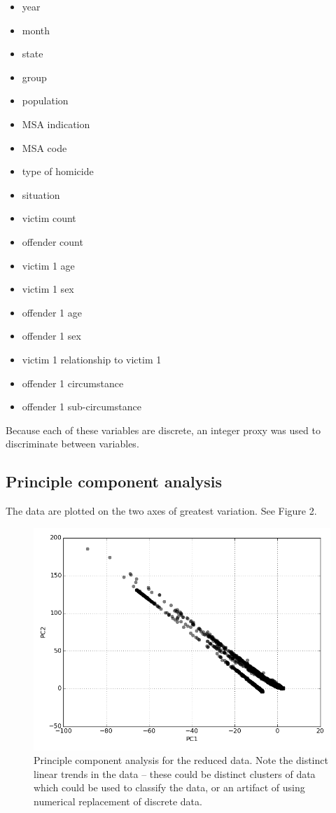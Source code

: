 \documentclass{evanarticle}
\begin{document}
\begin{itemize}
  \item year
  \item month
  \item state
  \item group
  \item population
  \item MSA indication
  \item MSA code
  \item type of homicide
  \item situation
  \item victim count
  \item offender count
  \item victim 1 age
  \item victim 1 sex
  \item offender 1 age
  \item offender 1 sex
  \item victim 1 relationship to victim 1
  \item offender 1 circumstance
  \item offender 1 sub-circumstance
\end{itemize}

Because each of these variables are discrete, an integer proxy was used to discriminate between variables.

\subsection{Principle component analysis}

The data are plotted on the two axes of greatest variation.  See Figure 2.

\begin{figure}[H]
  \centering
    \includegraphics[width=\linewidth]{images/PCA.png}
  \caption{Principle component analysis for the reduced data.  Note the distinct linear trends in the data -- these could be distinct clusters of data which could be used to classify the data, or an artifact of using numerical replacement of discrete data.}
\end{figure}
\end{document}
